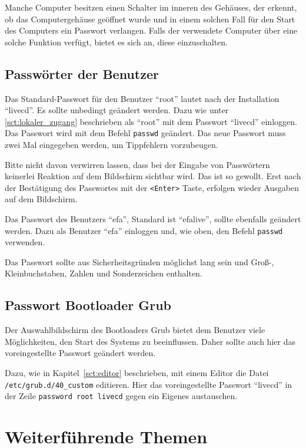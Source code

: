 \documentclass[a4paper,12pt,twoside]{article}
\begin{document}
Manche Computer besitzen einen Schalter im inneren des Gehäuses, der
erkennt, ob das Computergehäuse geöffnet wurde und in einem solchen
Fall für den Start des Computers ein Passwort verlangen. Falls der
verwendete Computer über eine solche Funktion verfügt, bietet es sich
an, diese einzuschalten.


\subsection{Passwörter der Benutzer}
\label{sct:password_admin}
Das Standard-Passwort für den Benutzer "`root"' lautet nach der Installation
"`livecd"'. Es sollte unbedingt geändert werden. Dazu wie unter \ref{sct:lokaler_zugang} beschrieben als
"`root"' mit dem Passwort "`livecd"' einloggen. Das Passwort wird mit
dem Befehl \texttt{passwd} geändert. Das neue
Passwort muss zwei Mal eingegeben werden, um Tippfehlern vorzubeugen. 

Bitte nicht davon verwirren lassen, dass bei der Eingabe von Passwörtern
keinerlei Reaktion auf dem Bildschirm sichtbar wird. Das ist so
gewollt. Erst nach der Bestätigung des Passwortes mit der
\texttt{{\textless}Enter{\textgreater}} Taste, erfolgen wieder Ausgaben auf dem
Bildschirm.

Das Passwort des Benutzers "`efa"', Standard ist "`efalive"', sollte ebenfalls geändert werden. Dazu 
als Benutzer "`efa"' einloggen und, wie oben, den Befehl \texttt{passwd} verwenden.

Das Passwort sollte aus Sicherheitsgründen möglichst lang sein und
Groß-, Kleinbuchstaben, Zahlen und Sonderzeichen enthalten.


\subsection{Passwort Bootloader Grub}
\label{sct:passwort_grub}
Der Auswahlbildschirm des Bootloaders Grub \cite{GRB1} bietet dem
Benutzer viele Möglichkeiten, den Start des Systems zu beeinflussen.
Daher sollte auch hier das voreingestellte Passwort geändert werden.

Dazu, wie in Kapitel~\ref{sct:editor} beschrieben, mit
einem Editor die Datei \linebreak[4]\texttt{/etc/grub.d/40\_custom} editieren. Hier das
voreingestellte Passwort "`livecd"' in der
Zeile \texttt{password root livecd} gegen ein
Eigenes austauschen.


\section{Weiterführende Themen}
\label{sct:weitere_themen}
\end{document}
